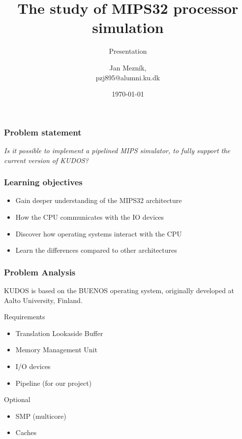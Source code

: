 \documentclass{beamer}
\title{The study of MIPS32 processor simulation}
\subtitle{Presentation}
\author{Jan Mezník,\\ pzj895@alumni.ku.dk}
\institute{Copenhagen University}
\date{\today}
\begin{document}
\frame[plain]{\titlepage}



\begin{frame}
	\frametitle{Problem statement}
	\textit{Is it possible to implement a pipelined MIPS simulator, to fully
		support the current version of KUDOS?}\\
\end{frame}

\begin{frame}
	\frametitle{Learning objectives}

	\begin{itemize}
		\item Gain deeper understanding of the MIPS32 architecture

		\item How the CPU communicates with the IO devices

		\item Discover how operating systems interact with the CPU

		\item Learn the differences compared to other architectures

	\end{itemize}
\end{frame}

\begin{frame}
	\frametitle{Problem Analysis}
	KUDOS is based on the BUENOS operating system, originally developed at
	Aalto University, Finland.

\begin{block}{Requirements}
	\begin{itemize}
		\item Translation Lookaside Buffer
		\item Memory Management Unit
		\item I/O devices
		\item Pipeline (for our project)
	\end{itemize}
\end{block}
\begin{block}{Optional}
	\begin{itemize}
		\item SMP (multicore)
		\item Caches
	\end{itemize}
\end{block}
\end{frame}
\end{document}
